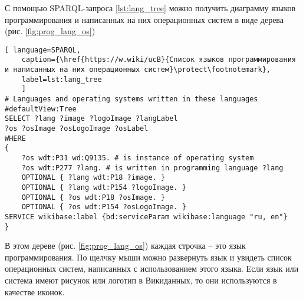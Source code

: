 С помощью SPARQL-запроса \ref{lst:lang_tree} можно получить диаграмму языков программирования и написанных на них операционных систем в виде дерева (рис.  \ref{fig:prog_lang_os})

\begin{marginfigure}[0.0cm]
	{
		\setlength{\fboxsep}{0pt}%
		\setlength{\fboxrule}{1pt}%
	}
	\caption{Дерево языков программирования и написанных на них операционных систем}
	\label{fig:prog_lang_os}%
\end{marginfigure}



\begin{lstlisting}[ language=SPARQL, 
	caption={\href{https://w.wiki/ucB}{Список языков программирования и написанных на них операционных систем}\protect\footnotemark},
	label=lst:lang_tree
	]
# Languages and operating systems written in these languages
#defaultView:Tree
SELECT ?lang ?image ?logoImage ?langLabel 
?os ?osImage ?osLogoImage ?osLabel 
WHERE 
{
	?os wdt:P31 wd:Q9135. # is instance of operating system
	?os wdt:P277 ?lang. # is written in programming language ?lang
	OPTIONAL { ?lang wdt:P18 ?image. }
	OPTIONAL { ?lang wdt:P154 ?logoImage. }
	OPTIONAL { ?os wdt:P18 ?osImage. }
	OPTIONAL { ?os wdt:P154 ?osLogoImage. }
SERVICE wikibase:label {bd:serviceParam wikibase:language "ru, en"}
}
\end{lstlisting}

В этом дереве (рис. \ref{fig:prog_lang_os}) каждая строчка -- это язык программирования. По щелчку мыши можно развернуть язык и увидеть список операционных систем, написанных с использованием этого языка. Если язык или система имеют рисунок или логотип в Викиданных, то они используются в качестве иконок.

